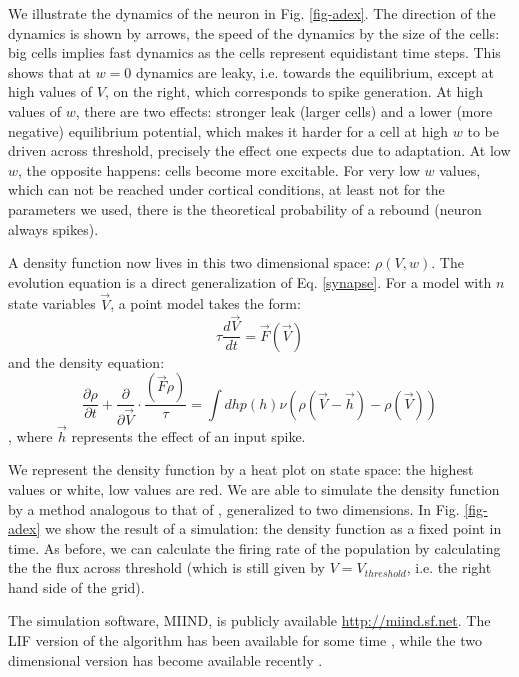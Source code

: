 \documentclass[10pt]{article}
\begin{document}
We illustrate the dynamics of the neuron in Fig. \ref{fig-adex}.
The direction of the dynamics is shown by arrows, the speed of the dynamics by the size of the cells:
big cells implies fast dynamics as the cells represent equidistant time steps.
This shows that at $w =0$ dynamics are leaky,  i.e. towards the equilibrium, except at high values of $V$, on the right, which corresponds to spike generation.
At high values of $w$, there are two effects: stronger leak (larger cells) and a lower (more negative) equilibrium potential, which makes it harder for a cell at high $w$ to be driven across threshold, precisely the effect one expects due to adaptation.
At low $w$, the opposite happens: cells become more excitable.
For very low $w$ values, which can not be reached under cortical conditions, at least not for the parameters we used, there is the theoretical probability of a rebound (neuron always spikes).

A density function now lives in this two dimensional space: $\rho(V,w)$.
The evolution equation is a direct generalization of Eq. \ref{synapse}.
For a model with $n$ state variables $\vec{V}$, a point model takes the form:
\begin{equation}
\tau \frac{d \vec{V}}{dt} = \vec{F}(\vec{V})
\end{equation}
and the density equation:
\begin{equation}
\frac{\partial \rho}{\partial t} + \frac{\partial}{\partial \vec{V}} \cdot \frac{( \vec{F} \rho)}{\tau} = \int dh p(h) \nu (\rho(\vec{V} - \vec{h}) -\rho(\vec{V}))
\end{equation},
where $\vec{h}$ represents the effect of an input spike.

We represent the density function by a heat plot on state space: the highest values or white, low values are red.
We are able to simulate the density function by a method analogous to that of \cite{de2013generica,iyer2013influence}, generalized to two dimensions.
In Fig. \ref{fig-adex} we show the result of a simulation: the density function as a fixed point in time.
As before, we can calculate the firing rate of the population by calculating the the flux across threshold (which is still given by $V= V_{threshold}$, i.e. the right hand side of the grid).

The simulation software, MIIND, is publicly available \url{http://miind.sf.net}. The LIF version of the algorithm has been available for some time \cite{de_Kamps_2008}, while the two dimensional version has become available recently \cite{dekamps2017b}.
\end{document}

